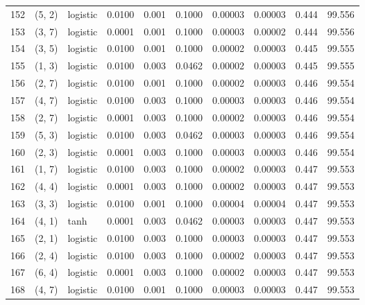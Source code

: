 \begin{tabular}{lllrrrrrrr}
152 &      (5, 2) &  logistic &  0.0100 &  0.001 &  0.1000 &          0.00003 &    0.00003 &       0.444 &    99.556 \\
153 &      (3, 7) &  logistic &  0.0001 &  0.001 &  0.1000 &          0.00003 &    0.00002 &       0.444 &    99.556 \\
154 &      (3, 5) &  logistic &  0.0100 &  0.001 &  0.1000 &          0.00002 &    0.00003 &       0.445 &    99.555 \\
155 &      (1, 3) &  logistic &  0.0100 &  0.003 &  0.0462 &          0.00002 &    0.00003 &       0.445 &    99.555 \\
156 &      (2, 7) &  logistic &  0.0100 &  0.001 &  0.1000 &          0.00002 &    0.00003 &       0.446 &    99.554 \\
157 &      (4, 7) &  logistic &  0.0100 &  0.003 &  0.1000 &          0.00003 &    0.00003 &       0.446 &    99.554 \\
158 &      (2, 7) &  logistic &  0.0001 &  0.003 &  0.1000 &          0.00002 &    0.00003 &       0.446 &    99.554 \\
159 &      (5, 3) &  logistic &  0.0100 &  0.003 &  0.0462 &          0.00003 &    0.00003 &       0.446 &    99.554 \\
160 &      (2, 3) &  logistic &  0.0001 &  0.003 &  0.1000 &          0.00003 &    0.00003 &       0.446 &    99.554 \\
161 &      (1, 7) &  logistic &  0.0100 &  0.003 &  0.1000 &          0.00002 &    0.00003 &       0.447 &    99.553 \\
162 &      (4, 4) &  logistic &  0.0001 &  0.003 &  0.1000 &          0.00002 &    0.00003 &       0.447 &    99.553 \\
163 &      (3, 3) &  logistic &  0.0100 &  0.001 &  0.1000 &          0.00004 &    0.00004 &       0.447 &    99.553 \\
164 &      (4, 1) &      tanh &  0.0001 &  0.003 &  0.0462 &          0.00003 &    0.00003 &       0.447 &    99.553 \\
165 &      (2, 1) &  logistic &  0.0100 &  0.003 &  0.1000 &          0.00003 &    0.00003 &       0.447 &    99.553 \\
166 &      (2, 4) &  logistic &  0.0100 &  0.003 &  0.1000 &          0.00002 &    0.00003 &       0.447 &    99.553 \\
167 &      (6, 4) &  logistic &  0.0001 &  0.003 &  0.1000 &          0.00002 &    0.00003 &       0.447 &    99.553 \\
168 &      (4, 7) &  logistic &  0.0100 &  0.001 &  0.1000 &          0.00003 &    0.00003 &       0.447 &    99.553 \\

\end{tabular}
